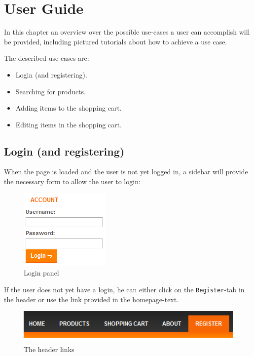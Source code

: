 \chapter{User Guide}\label{ch:user_guide} %

In this chapter an overview over the possible use-cases a user can accomplish will be provided, including pictured tutorials about how to achieve a use case.

The described use cases are:

\begin{itemize}
\item Login (and registering).
\item Searching for products.
\item Adding items to the shopping cart.
\item Editing items in the shopping cart.
\end{itemize}

\section{Login (and registering)}
\label{sec:login}

When the page is loaded and the user is not yet logged in, a sidebar will provide the necessary form to allow the user to login:

\begin{figure}[H]
\begin{center}
\includegraphics[scale=1]{gfx/login.png}
\caption{Login panel}
\label{fig:login}
\end{center}
\end{figure}

If the user does not yet have a login, he can either click on the \texttt{Register}-tab in the header or use the link provided in the homepage-text.

\begin{figure}[H]
\begin{center}
\includegraphics[scale=1]{gfx/header.png}
\caption{The header links}
\label{fig:header}
\end{center}
\end{figure}

